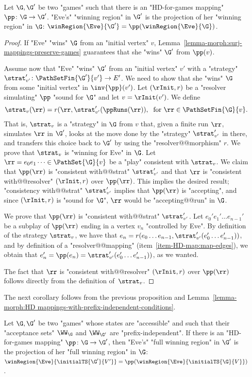 \documentclass{theoretics}
\begin{document}
\begin{proposition}\label{prop-morph:HD mappings-preserve-games}
	Let $\G, \G'$ be two "games" such that there is an "HD-for-games mapping" $\pp\colon \G \to \G'$. "Eve's" "winning region" in $\G'$ is the projection of her "winning region" in $\G$: $\winRegion{\Eve}{\G'} = \pp(\winRegion{\Eve}{\G})$.	
\end{proposition}
\begin{proof}
	If "Eve" "wins" $\G$ from an "initial vertex" $v$, Lemma~\ref{lemma-morph:surj-mappings-preserve-games} guarantees that she "wins" $\G'$ from $\pp(v)$.
	
	Assume now that "Eve" "wins" $\G'$ from an "initial vertex" $v'$ with a "strategy" $\strat'_{v'}\colon \PathSetFin{\G'}{v'}\to E'$. We need to show that she "wins" $\G$ from some "initial vertex" in $\inv{\pp}(v')$. Let $(\rInit,r)$ be a "resolver simulating" $\pp$ "sound for $\G$" and let $v=\rInit(v')$.  We define
	\[\strat_{v}(\rr) = r(\rr, \strat'_{v'}(\ppRuns(\rr)), \; \text{ for } \rr\in \PathSetFin{\G}{v}.\]
	 That  is, $\strat_{v}$ is a "strategy" in $\G$ from $v$ that, given a finite run $\rr$, simulates $\rr$ in $\G'$, looks at the move done by the "strategy" $\strat'_{v'}$ in there, and transfers this choice back to $\G'$ by using the "resolver@@morphism" $r$. We prove that $\strat_{v}$ is "winning for Eve" in $\G$. Let $\rr = e_0e_1\dots\in \PathSet{\G}{v}$ be a "play" consistent with $\strat_{v}$. We claim that $\pp(\rr)$  is "consistent with@@strat" $\strat'_{v'}$ and that $\rr$ is "consistent with@@resolver" $(\rInit,r)$ over $\pp(\rr)$. This implies the desired result; "consistency with@@strat" $\strat'_{v'}$ implies that $\pp(\rr)$ is "accepting", and since $(\rInit,r)$ is "sound for $\G$", $\rr$ would be "accepting@@run" in $\G$.
	
	We prove that $\pp(\rr)$ is "consistent with@@strat" $\strat'_{v'}$. Let $e_0'e_1'\dots e_{n-1}'$ be a subplay of $\pp(\rr)$ ending in a vertex $v_n$ "controlled by Eve". By definition of the strategy $\strat_{v}$, we have that $e_n = r(e_0\dots e_{n-1}, \strat'_{v'}(e_0'\dots e_{n-1}'))$, and by definition of a "resolver@@mapping" (item~\ref{item-HD-map:map-edges}), we obtain that $e_n' = \pp(e_n) = \strat'_{v'}(e_0'\dots e_{n-1}'))$, as we wanted.
	
	The fact that $\rr$ is "consistent with@@resolver" $(\rInit,r)$ over $\pp(\rr)$ follows directly from the definition of~$\strat_{v}$.
\end{proof}

The next corollary follows from the previous proposition and Lemma~\ref{lemma-morph:HD mappings-with-prefix-independent-conditions}.
\begin{corollary}\label{cor-morph:HD-map-preserve-full-WR}
	Let $\G, \G'$ be two "games" whose states are "accessible" and such that their "acceptance sets" $\WW_\G$ and $\WW_{\G'}$ are "prefix-independent". If there is an "HD-for-games mapping" $\pp\colon \G \to \G'$, then "Eve's" "full winning region" in $\G'$ is the projection of her "full winning region" in $\G$: $\winRegion{\Eve}{\initialTS{\G'}{V'}} = \pp(\winRegion{\Eve}{\initialTS{\G}{V}})$.	
\end{corollary} 	
	
\end{document}
